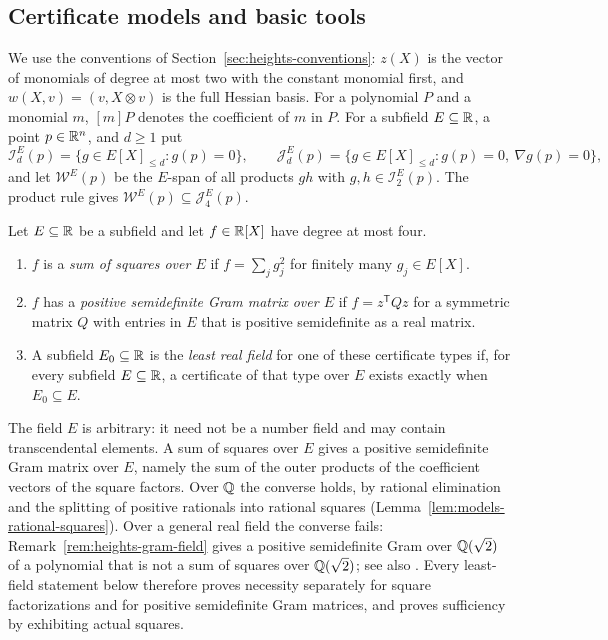 \subsection{Certificate models and basic tools}
\label{sec:fields-models}

We use the conventions of Section~\ref{sec:heights-conventions}: $z(X)$ is the
vector of monomials of degree at most two with the constant monomial first,
and $w(X,v)=(v,X\otimes v)$ is the full Hessian basis. For a polynomial $P$
and a monomial $m$, $[m]P$ denotes the coefficient of $m$ in $P$. For a
subfield $E\subseteq\mathbb R$, a point $p\in\mathbb R^n$, and $d\ge1$ put
\[
 \mathcal I_d^E(p)=\{g\in E[X]_{\le d}:g(p)=0\},\qquad
 \mathcal J_d^E(p)=\{g\in E[X]_{\le d}:g(p)=0,\ \nabla g(p)=0\},
\]
and let $\mathcal W^E(p)$ be the $E$-span of all products $gh$ with
$g,h\in\mathcal I_2^E(p)$. The product rule gives
$\mathcal W^E(p)\subseteq\mathcal J_4^E(p)$.

\begin{definition}
\label{def:fields-certificates}
Let $E\subseteq\mathbb R$ be a subfield and let $f\in\mathbb R[X]$ have degree at most
four.
\begin{enumerate}[label=(\alph*)]
\item $f$ is a \emph{sum of squares over $E$} if $f=\sum_jg_j^2$ for finitely
  many $g_j\in E[X]$.
\item $f$ has a \emph{positive semidefinite Gram matrix over $E$} if
  $f=z^{\mathsf T}Qz$ for a symmetric matrix $Q$ with entries in $E$ that is
  positive semidefinite as a real matrix.
\item A subfield $E_0\subseteq\mathbb R$ is the \emph{least real field} for one of
  these certificate types if, for every subfield $E\subseteq\mathbb R$, a certificate
  of that type over $E$ exists exactly when $E_0\subseteq E$.
\end{enumerate}
\end{definition}

The field $E$ is arbitrary: it need not be a number field and may contain
transcendental elements. A sum of squares over $E$ gives a positive
semidefinite Gram matrix over $E$, namely the sum of the outer products of
the coefficient vectors of the square factors. Over $\mathbb Q$ the converse holds,
by rational elimination and the splitting of positive rationals into rational
squares (Lemma~\ref{lem:models-rational-squares}). Over a general real field
the converse fails: Remark~\ref{rem:heights-gram-field} gives a positive
semidefinite Gram over $\mathbb Q(\sqrt2)$ of a polynomial that is not a sum of
squares over $\mathbb Q(\sqrt2)$; see also \cite[Lemma~1.6 and
Remark~1.7]{ChuaPlaumannSinnVinzant2017}. Every least-field statement below
therefore proves necessity separately for square factorizations and for
positive semidefinite Gram matrices, and proves sufficiency by exhibiting
actual squares.

